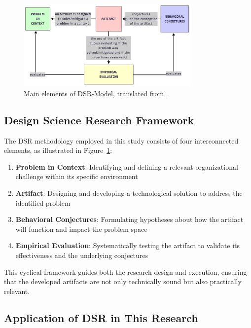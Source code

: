     \begin{figure}[h]
    \centering
    \includegraphics[width=0.8\textwidth]{images/dsr-model.png}
    \caption{Main elements of DSR-Model, translated from \citet{Oswald2023}.}
    \label{fig:dsr-model}
    \end{figure}
    
    \subsection{Design Science Research Framework}
    
        The DSR methodology employed in this study consists of four interconnected elements, as illustrated in Figure~\ref{fig:dsr-model}:
        
        \begin{enumerate}
        \item \textbf{Problem in Context}: Identifying and defining a relevant organizational challenge within its specific environment
        \item \textbf{Artifact}: Designing and developing a technological solution to address the identified problem
        \item \textbf{Behavioral Conjectures}: Formulating hypotheses about how the artifact will function and impact the problem space
        \item \textbf{Empirical Evaluation}: Systematically testing the artifact to validate its effectiveness and the underlying conjectures
        \end{enumerate}
        
        This cyclical framework guides both the research design and execution, ensuring that the developed artifacts are not only technically sound but also practically relevant.
    
    \subsection{Application of DSR in This Research}
        
